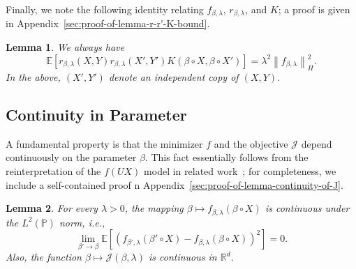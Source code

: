 \documentclass[sn-mathphys-num]{sn-jnl}%
\numberwithin{equation}{section}
\newcommand{\R}{\mathbb{R}}
\newcommand{\E}{\mathbb{E}}
\newcommand{\kernel}{K}
\newcommand{\norm}[1]{\left\|{#1}\right\|} %
\renewcommand{\P}{\mathbb{P}}
\newtheorem{lemma}{Lemma}
\theoremstyle{thmstyleone}%
\theoremstyle{thmstyletwo}%
\theoremstyle{thmstylethree}%
\begin{document}
\vspace{.5em}

Finally, we note the following identity relating $f_{\beta,\lambda}$, $r_{\beta,\lambda}$, and $\kernel$; a proof is given in Appendix~\ref{sec:proof-of-lemma-r-r'-K-bound}.

\vspace{.5em}
\begin{lemma}
\label{lemma:r-r'-K-bound}
We always have
	\begin{equation*}	
		\E[r_{\beta, \lambda}(X, Y) r_{\beta, \lambda}(X', Y') \kernel(\beta \circ X, \beta \circ X')] = \lambda^2 \norm{f_{\beta, \lambda}}_H^2.
	\end{equation*}
In the above, $(X', Y')$ denote an independent copy of $(X, Y)$. 
\end{lemma} 

 \vspace{.5em}

\subsection{Continuity in Parameter} 
A fundamental property is that the minimizer $f$ and the objective $\mathcal{J}$ depend 
continuously on the parameter $\beta$. 
This fact essentially follows from the reinterpretation of the $f(UX)$ model in related work~\cite{LiRu25}; 
for completeness, we include a self-contained proof n Appendix~\ref{sec:proof-of-lemma-continuity-of-J}.

\vspace{.5em} 
\begin{lemma}
\label{lemma:continuity-of-J}
For every $\lambda > 0$, the mapping $\beta \mapsto f_{\beta, \lambda}(\beta \circ X)$ is continuous under the $L^2(\P)$ norm, i.e., 
\begin{equation*}
	\lim_{\beta' \to \beta} \E[(f_{\beta', \lambda}(\beta'\circ X) - f_{\beta, \lambda}(\beta \circ X))^2] = 0.
\end{equation*}
Also, the function $\beta \mapsto \mathcal{J}(\beta, \lambda)$ is continuous in $\R^d$.  
\end{lemma} 
\end{document}
